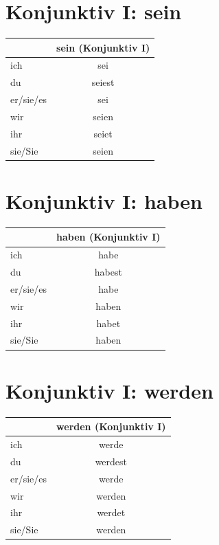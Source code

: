 \section{Konjunktiv I: sein}
\label{sec:KonjunktivIsein}

\begin{center}
\begin{tabular}{|l|c|}
\hline
\textbf{} & \textbf{sein (Konjunktiv I)} \\ \hline
ich & sei \\ \hline
du & seiest \\ \hline
er/sie/es & sei \\ \hline
wir & seien \\ \hline
ihr & seiet \\ \hline
sie/Sie & seien \\ \hline
\end{tabular}
\end{center}

\section{Konjunktiv I: haben}
\label{sec:KonjunktivIhaben}

\begin{center}
\begin{tabular}{|l|c|}
\hline
\textbf{} & \textbf{haben (Konjunktiv I)} \\ \hline
ich & habe \\ \hline
du & habest \\ \hline
er/sie/es & habe \\ \hline
wir & haben \\ \hline
ihr & habet \\ \hline
sie/Sie & haben \\ \hline
\end{tabular}
\end{center}

\section{Konjunktiv I: werden}
\label{sec:KonjunktivIwerden}

\begin{center}
\begin{tabular}{|l|c|}
\hline
\textbf{} & \textbf{werden (Konjunktiv I)} \\ \hline
ich & werde \\ \hline
du & werdest \\ \hline
er/sie/es & werde \\ \hline
wir & werden \\ \hline
ihr & werdet \\ \hline
sie/Sie & werden \\ \hline
\end{tabular}
\end{center}

